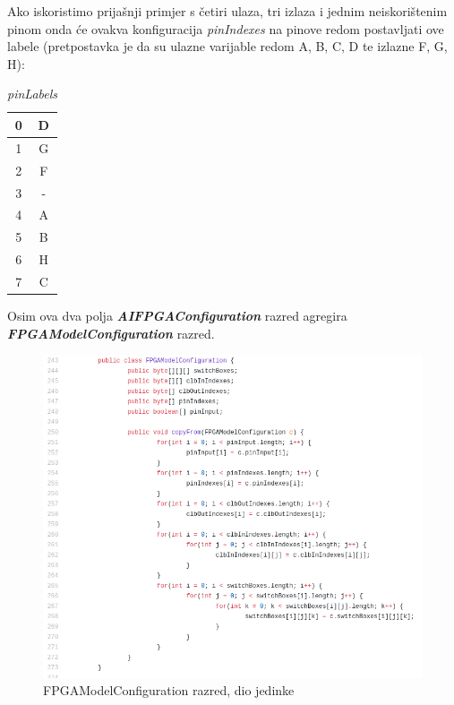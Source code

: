 \documentclass[times, utf8, zavrsni]{fer}
\begin{document}
Ako iskoristimo prijašnji primjer s četiri ulaza, tri izlaza i jednim neiskorištenim pinom onda će ovakva konfiguracija \emph{pinIndexes} na pinove redom postavljati ove labele (pretpostavka je da su ulazne varijable redom A, B, C, D te izlazne F, G, H):

 \begin{table}[htb]
 	\caption{\emph{pinLabels}}
 	\label{pinLabels}
 	\centering
 	\begin{tabular}{|c | c |} \hline
 		0 & D \\ \hline
 		1 & G \\ \hline
 		2 & F \\ \hline
 		3 & - \\ \hline
 		4 & A \\ \hline
 		5 & B \\ \hline
 		6 & H \\ \hline
 		7 & C \\ \hline
 	\end{tabular}
 \end{table}

Osim ova dva polja \textbf{\emph{AIFPGAConfiguration}} razred agregira \textbf{\emph{FPGAModelConfiguration}} razred. 

\begin{figure}[!htb]
	\centering
	\includegraphics[width=18cm]{slike/FPGAModelConf.png}
	\caption{FPGAModelConfiguration razred, dio jedinke}
	\label{fig:fpga-model-conf}
\end{figure} 
\end{document}
